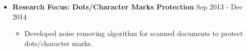 \documentclass[10pt]{article}
\newenvironment{outerlist}[1][\enskip\textbullet]%
        {\begin{itemize}[#1,leftmargin=*]}{\end{itemize}%
         \vspace{-1.2\baselineskip}}
\newenvironment{innerlist}[1][\enskip\textbullet]%
        {\begin{itemize}[#1,leftmargin=*,parsep=0pt,itemsep=0pt,topsep=0pt,partopsep=0pt]}
        {\end{itemize}}
\begin{document}
\begin{outerlist}
\begin{innerlist}
	\item Collaborated with Navel Postgraduate School to collect real flying videos
        \item Constructed dataset of 50 videos of real field test with multiple moving objects in view
	\item Publicized real flying object datasets by setting up website using JavaScript  and HTML 
        \item Validated algorithm on large dataset using 	\textbf{Python} 
        \item Delivered code for real flying drones with automatic collision avoidance(autopilot)
        \end{innerlist}
\item[] \textbf{Research Focus: Dots/Character Marks Protection} \hfill {Sep 2013 - Dec 2014}
\begin{innerlist}
\vspace{-.05in}
        \item Developed noise removing algorithm for scanned documents to protect dots/character marks.	
        \end{innerlist}
\vspace{.15in}
\end{outerlist}
\end{document}
